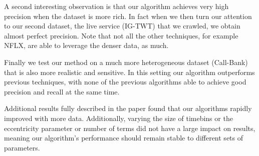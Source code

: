 A second interesting observation is that our algorithm achieves very high precision when the dataset is more rich. 
In fact when we then turn our attention to our second dataset, the live service (IG-TWT) that we crawled, we obtain almost perfect precision. 
Note that not all the other techniques, for example NFLX, are able to leverage the denser data, as much.

Finally we test our method on a much more heterogeneous dataset (Call-Bank) that is also more realistic and sensitive. 
In this setting our algorithm outperforms previous techniques, with none of the previous algorithms able to achieve good precision and recall at the same time. 

Additional results fully described in the paper found that our algorithms rapidly improved with more data.
Additionally, varying the size of timebins or the eccentricity parameter or number of terms did not have a large impact on results, meaning our algorithm's performance should remain stable to different sets of parameters.

